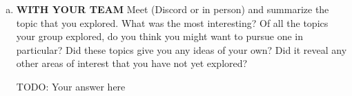 \documentclass[letterpaper,11pt]{article}
\begin{document}
\begin{enumerate}[a)]
\item \textbf{WITH YOUR TEAM} Meet (Discord or in person) and summarize the topic that you explored. What was the most interesting? Of all the topics your group explored, do you think you might want to pursue one in particular? Did these topics give you any ideas of your own? Did it reveal any other areas of interest that you have not yet explored?

\begin{tcolorbox}
TODO: Your answer here
\newline
\newline
\newline
\newline
\newline
\end{tcolorbox}

\end{enumerate}
\end{document}
